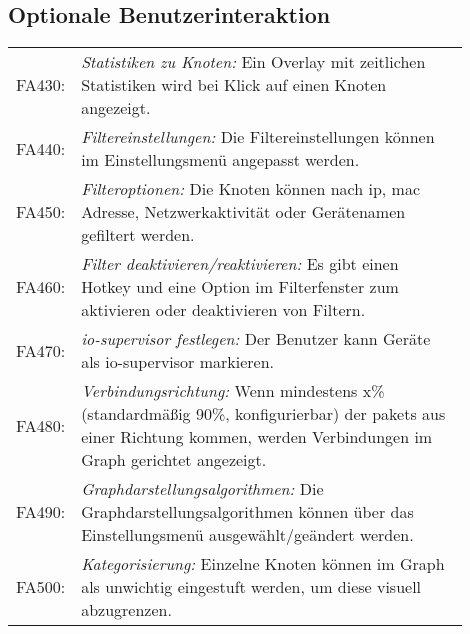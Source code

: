 \subsection{Optionale Benutzerinteraktion}

\begin{longtable}{lp{0.9\linewidth}}

FA430: & \textit{Statistiken zu Knoten: }Ein Overlay mit zeitlichen Statistiken wird bei Klick auf einen Knoten angezeigt. \\

FA440: & \textit{Filtereinstellungen: }Die Filtereinstellungen können im Einstellungsmenü angepasst werden. \\

FA450: & \textit{Filteroptionen: }Die Knoten können nach \gls{ip}, \gls{mac} Adresse, Netzwerkaktivität oder Gerätenamen gefiltert werden. \\

FA460: & \textit{Filter deaktivieren/reaktivieren: }Es gibt einen Hotkey und eine Option im Filterfenster zum aktivieren oder deaktivieren von Filtern. \\

FA470: & \textit{\gls{io-supervisor} festlegen: }Der Benutzer kann Geräte als \gls{io-supervisor} markieren. \\

FA480: & \textit{Verbindungsrichtung: }Wenn mindestens x\% (standardmäßig 90\%, konfigurierbar) der \glspl{paket} aus einer Richtung kommen, werden Verbindungen im Graph gerichtet angezeigt. \\

FA490: & \textit{Graphdarstellungsalgorithmen: }Die Graphdarstellungsalgorithmen können über das Einstellungsmenü ausgewählt/geändert werden. \\

FA500: & \textit{Kategorisierung: }Einzelne Knoten können im Graph als unwichtig eingestuft werden, um diese visuell abzugrenzen. \\
\end{longtable}
